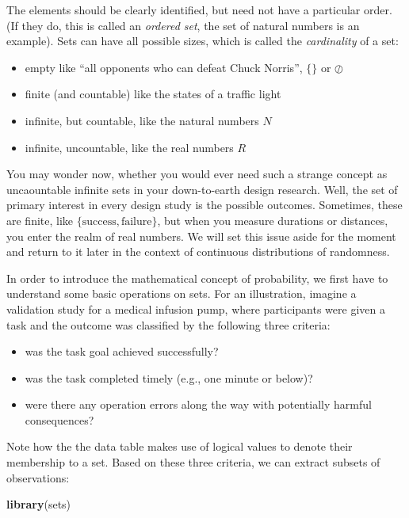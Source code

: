 \documentclass[]{svmono}
\newenvironment{Shaded}{\begin{snugshade}}{\end{snugshade}}
\newcommand{\KeywordTok}[1]{\textcolor[rgb]{0.13,0.29,0.53}{\textbf{#1}}}
\newcommand{\NormalTok}[1]{#1}
\providecommand{\tightlist}{%
  \setlength{\itemsep}{0pt}\setlength{\parskip}{0pt}}
\begin{document}
The elements should be clearly identified, but need not have a
particular order. (If they do, this is called an \emph{ordered set}, the
set of natural numbers is an example). Sets can have all possible sizes,
which is called the \emph{cardinality} of a set:

\begin{itemize}
\tightlist
\item
  empty like ``all opponents who can defeat Chuck Norris'', \(\{\}\) or
  \(\oslash\)
\item
  finite (and countable) like the states of a traffic light
\item
  infinite, but countable, like the natural numbers \(N\)
\item
  infinite, uncountable, like the real numbers \(R\)
\end{itemize}

You may wonder now, whether you would ever need such a strange concept
as uncaountable infinite sets in your down-to-earth design research.
Well, the set of primary interest in every design study is the possible
outcomes. Sometimes, these are finite, like
\(\{\textrm{success}, \textrm{failure}\}\), but when you measure
durations or distances, you enter the realm of real numbers. We will set
this issue aside for the moment and return to it later in the context of
continuous distributions of randomness.

In order to introduce the mathematical concept of probability, we first
have to understand some basic operations on sets. For an illustration,
imagine a validation study for a medical infusion pump, where
participants were given a task and the outcome was classified by the
following three criteria:

\begin{itemize}
\tightlist
\item
  was the task goal achieved successfully?
\item
  was the task completed timely (e.g., one minute or below)?
\item
  were there any operation errors along the way with potentially harmful
  consequences?
\end{itemize}

Note how the the data table makes use of logical values to denote their
membership to a set. Based on these three criteria, we can extract
subsets of observations:

\begin{Shaded}
\begin{Highlighting}[]
\KeywordTok{library}\NormalTok{(sets)}
\end{Highlighting}
\end{Shaded}
\end{document}
